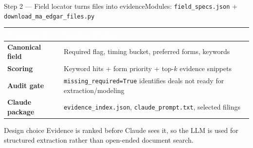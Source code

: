 \documentclass[aspectratio=169,10pt]{beamer}
\newcommand{\hdr}[1]{\textcolor{white}{\normalfont\bfseries #1}}
\begin{document}
\begin{frame}{Step 2 --- Field locator turns files into evidence}{Modules: \texttt{field\_specs.json} + \texttt{download\_ma\_edgar\_files.py}}
  \vspace{0.2cm}
  \begin{tabularx}{\linewidth}{@{}>{\bfseries}p{3.2cm} X@{}}
    \rowcolor{navy}\hdr{Component} & \hdr{Implementation}\\ \midrule
    Canonical field & Required flag, timing bucket, preferred forms, keywords\\
    Scoring & Keyword hits + form priority + top-$k$ evidence snippets\\
    Audit gate & \texttt{missing\_required=True} identifies deals not ready for extraction/modeling\\
    Claude package & \texttt{evidence\_index.json}, \texttt{claude\_prompt.txt}, selected filings\\
  \end{tabularx}
  \vspace{0.45cm}
  \begin{block}{Design choice}
    Evidence is ranked before Claude sees it, so the LLM is used for structured extraction rather than open-ended document search.
  \end{block}
\end{frame}
\end{document}
